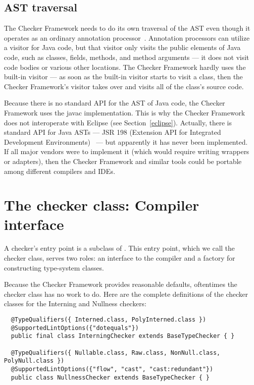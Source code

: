 \subsection{AST traversal\label{ast-traversal}}

The Checker Framework needs to do its own traversal of the AST even though
it operates as an ordinary annotation processor~\cite{JSR269}.  Annotation
processors can utilize a visitor for Java code, but that visitor only
visits the public elements of Java code, such as classes, fields, methods,
and method arguments --- it does not visit code bodies or various other
locations.  The Checker Framework hardly uses the built-in visitor --- as
soon as the built-in visitor starts to visit a class, then the Checker
Framework's visitor takes over and visits all of the class's source code.

Because there is no standard API for the AST of Java code, the Checker
Framework uses the javac implementation.  This is why the Checker Framework
does not interoperate with Eclipse (see Section~\ref{eclipse}).  Actually,
there is standard API for Java ASTs --- JSR 198 (Extension API for
Integrated Development Environments)~\cite{JSR198} --- but apparently it
has never been implemented.  If all major vendors were to implement it
(which would require writing wrappers or adapters), then the Checker
Framework and similar tools could be portable among different compilers and
IDEs.


\section{The checker class:  Compiler interface\label{writing-compiler-interface}}

A checker's entry point is a subclass of .  This entry
point, which we call the checker class, serves two
roles:  an interface to the compiler and a factory for constructing
type-system classes.

Because the Checker Framework provides reasonable defaults, oftentimes the
checker class has no work to do.  Here are the complete definitions of the
checker classes for the Interning and Nullness checkers:

\begin{Verbatim}
  @TypeQualifiers({ Interned.class, PolyInterned.class })
  @SupportedLintOptions({"dotequals"})
  public final class InterningChecker extends BaseTypeChecker { }

  @TypeQualifiers({ Nullable.class, Raw.class, NonNull.class, PolyNull.class })
  @SupportedLintOptions({"flow", "cast", "cast:redundant"})
  public class NullnessChecker extends BaseTypeChecker { }
\end{Verbatim}


